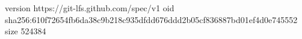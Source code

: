 version https://git-lfs.github.com/spec/v1
oid sha256:610f72654fb6da38c9b218c935dfdd676ddd2b05cf836887bd01ef4d0e745552
size 524384
